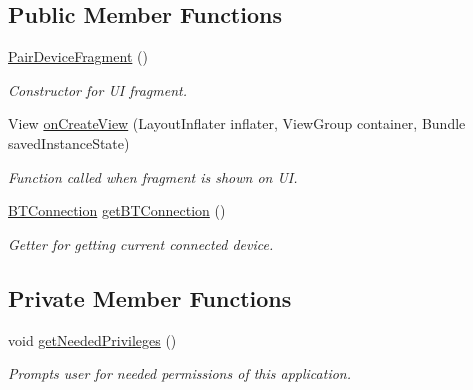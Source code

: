\subsection*{Public Member Functions}
\begin{DoxyCompactItemize}
\item 
\hyperlink{class_android_app_1_1_pair_device_fragment_a0abb8db1228e66ff5073816588c77415}{Pair\+Device\+Fragment} ()
\begin{DoxyCompactList}\small\item\em Constructor for UI fragment. \end{DoxyCompactList}\item 
View \hyperlink{class_android_app_1_1_pair_device_fragment_af20a6287fc02c251141fef1c24b5e911}{on\+Create\+View} (Layout\+Inflater inflater, View\+Group container, Bundle saved\+Instance\+State)
\begin{DoxyCompactList}\small\item\em Function called when fragment is shown on UI. \end{DoxyCompactList}\item 
\hyperlink{class_android_app_1_1_b_t_connection}{B\+T\+Connection} \hyperlink{class_android_app_1_1_pair_device_fragment_ae68bfed66a421a3020a257cbc034e42d}{get\+B\+T\+Connection} ()
\begin{DoxyCompactList}\small\item\em Getter for getting current connected device. \end{DoxyCompactList}\end{DoxyCompactItemize}
\subsection*{Private Member Functions}
\begin{DoxyCompactItemize}
\item 
void \hyperlink{class_android_app_1_1_pair_device_fragment_ac6569d8f68c8023f2c2d38da55260f29}{get\+Needed\+Privileges} ()
\begin{DoxyCompactList}\small\item\em Prompts user for needed permissions of this application. \end{DoxyCompactList}\end{DoxyCompactItemize}
